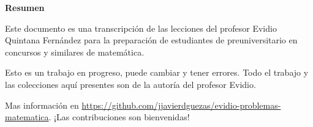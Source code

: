 \fancyhf{} %
\fancyhead[RO,R]{\thepage} %
\renewcommand{\headrulewidth}{0pt}

\begin{center}
    
    
    
    \textbf{Resumen}
\end{center}

Este documento es una transcripción de las lecciones del profesor Evidio Quintana Fernández para la preparación de estudiantes de preuniversitario en concursos y similares de matemática. 

Esto es un trabajo en progreso, puede cambiar y tener errores. Todo el trabajo y las colecciones aquí presentes son de la autoría del profesor Evidio.

Mas información en \href{https://github.com/jjavierdguezas/evidio-problemas-matematica}{https://github.com/jjavierdguezas/evidio-problemas-matematica}. ¡Las contribuciones son bienvenidas!
